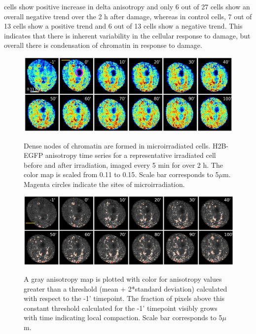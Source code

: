 cells show positive increase in delta anisotropy and only 6 out of 27 cells show an overall negative trend over the 2 h after damage, whereas in control cells, 7 out of 13 cells show a positive trend and 6 out of 13 cells show a negative trend. This indicates that there is inherent variability in the cellular response to damage, but overall there is condensation of chromatin in response to damage.


\begin{figure}[H]
    {\hfill\includegraphics[clip,width=1\linewidth]{figures/live_an.png}\hspace*{\fill}}
    \caption{Dense nodes of chromatin are formed in microirradiated cells. H2B-EGFP anisotropy time series for a representative irradiated cell before and after irradiation, imaged every 5 min for over 2 h. The color map is scaled from 0.11 to 0.15. Scale bar corresponds to 5$\mu$m. Magenta circles indicate the sites of microirradiation.}
    {\label{fig:live_an}}
\end{figure}

\begin{figure}[H]
    {\hfill\includegraphics[clip, width=1\linewidth]{figures/thresholded.png}\hspace*{\fill}}
    \caption{A gray anisotropy map is plotted with color for anisotropy values greater than a threshold (mean + 2*standard deviation) calculated with respect to the -1' timepoint. The fraction of pixels above this constant threshold calculated for the -1' timepoint visibly grows with time indicating local compaction. Scale bar corresponds to 5$\mu$m.}
    {\label{fig:thresholded}}
\end{figure}

